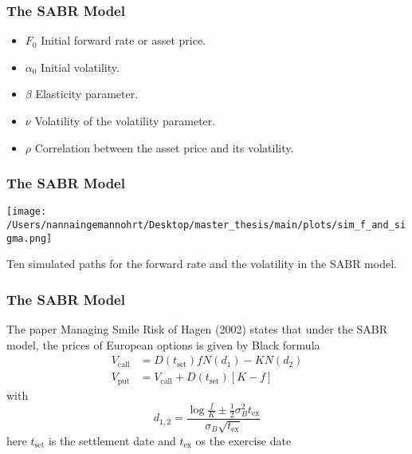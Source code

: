 \documentclass{beamer}
\begin{document}
\begin{frame}
    \frametitle{\textcolor{KUrod}{The SABR Model}}
    \begin{itemize}[label=\textcolor{KUrod}{\textbullet}]
        \item $F_0$ \text{---} Initial forward rate or asset price.
        \item $\alpha_0$ \text{---} Initial volatility.
        \item $\beta$ \text{---} Elasticity parameter.
        \item $\nu$ \text{---} Volatility of the volatility parameter.
        \item $\rho$ \text{---} Correlation between the asset price and its volatility.
    \end{itemize}
\end{frame}

\begin{frame}
    \frametitle{\textcolor{KUrod}{The SABR Model}}
    \centering
    \texttt{[image: /Users/nannaingemannohrt/Desktop/master\_thesis/main/plots/sim\_f\_and\_sigma.png]}
    \caption{Ten simulated paths for the forward rate and the volatility in the SABR model.}
\end{frame}

\begin{frame}
    \frametitle{\textcolor{KUrod}{The SABR Model}}
    The paper Managing Smile Risk 
of Hagen (2002) states that
under the SABR model, the prices of European options 
is given by Black formula 
\begin{align}
    V_{\text{call}} &= D(t_{\text{set}})fN(d_1) - KN(d_2)  \label{sabr1}\\
    V_{\text{put}} &= V_{\text{call}} + D(t_{\text{set}})[K - f] \label{sabr2}
\end{align}
with
\begin{equation}
    d_{1,2} = \frac{\log \frac{f}{K} \pm \frac{1}{2}\sigma_B^2 t_{\text{ex}}}{\sigma_B \sqrt{t_{\text{ex}}}}
\end{equation}
here $t_{\text{set}}$ is the settlement date and $t_{\text{ex}}$ os the exercise date 

\end{frame}
\end{document}
